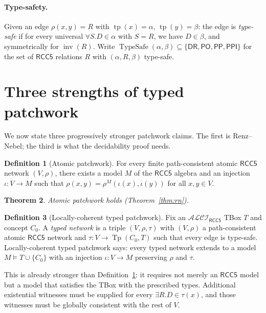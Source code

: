 \documentclass[11pt]{article}
\newtheorem{theorem}{Theorem}[section]
\theoremstyle{definition}
\newtheorem{definition}[theorem]{Definition}
\theoremstyle{remark}
\newcommand{\DR}{\mathsf{DR}}
\newcommand{\PO}{\mathsf{PO}}
\newcommand{\PP}{\mathsf{PP}}
\newcommand{\PPI}{\mathsf{PPI}}
\newcommand{\RCC}{\{\DR,\PO,\PP,\PPI\}}
\newcommand{\Tp}{\operatorname{Tp}}
\newcommand{\tp}{\operatorname{tp}}
\newcommand{\inv}{\operatorname{inv}}
\newcommand{\TypeSafe}{\operatorname{TypeSafe}}
\newcommand{\ALCIRCC}[1]{\mathcal{ALCI}_{\mathsf{RCC#1}}}
\begin{document}
\paragraph{Type-safety.}
Given an edge $\rho(x, y) = R$ with $\tp(x) = \alpha$, $\tp(y) = \beta$:
the edge is \emph{type-safe} if for every universal $\forall S.D
\in \alpha$ with $S = R$, we have $D \in \beta$, and symmetrically
for $\inv(R)$.  Write $\TypeSafe(\alpha, \beta) \subseteq \RCC$ for
the set of $\mathsf{RCC5}$ relations $R$ with $(\alpha, R, \beta)$
type-safe.

\section{Three strengths of typed patchwork}
\label{sec:typed}

We now state three progressively stronger patchwork claims.  The
first is Renz--Nebel; the third is what the decidability proof needs.

\begin{definition}[Atomic patchwork]
\label{def:atomic-pw}
For every finite path-consistent atomic $\mathsf{RCC5}$ network
$(V, \rho)$, there exists a model $M$ of the $\mathsf{RCC5}$ algebra
and an injection $\iota: V \to M$ such that
$\rho(x,y) = \rho^M(\iota(x), \iota(y))$ for all $x,y \in V$.
\end{definition}

\begin{theorem}
Atomic patchwork holds (Theorem~\ref{thm:rn}).
\end{theorem}

\begin{definition}[Locally-coherent typed patchwork]
\label{def:lc-pw}
Fix an $\ALCIRCC{5}$ TBox $T$ and concept $C_0$.  A \emph{typed
network} is a triple $(V, \rho, \tau)$ with $(V, \rho)$ a
path-consistent atomic $\mathsf{RCC5}$ network and
$\tau : V \to \Tp(C_0, T)$ such that every edge is type-safe.
Locally-coherent typed patchwork says: every typed network extends
to a model $M \models T \cup \{C_0\}$ with an injection
$\iota: V \to M$ preserving $\rho$ and $\tau$.
\end{definition}

This is already stronger than Definition~\ref{def:atomic-pw}: it
requires not merely an $\mathsf{RCC5}$ model but a model that
satisfies the TBox with the prescribed types.  Additional existential
witnesses must be supplied for every $\exists R.D \in \tau(x)$, and
those witnesses must be globally consistent with the rest of $V$.
\end{document}
